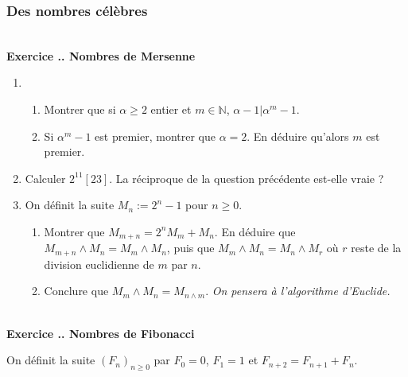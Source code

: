 \documentclass{article}
\newcommand{\mb}[1]{\mathbb{#1}}
\newcounter{exo}
\newcommand{\exercice}[1][\null]{\textbf{\\ Exercice \thesection.\theexo. #1} \addtocounter{exo}{1}}
\begin{document}
\subsubsection{Des nombres célèbres}


\exercice[Nombres de Mersenne]

\begin{enumerate}

\item 

\begin{enumerate}

\item Montrer que si $\alpha \ge 2$ entier et $m \in \mb{N}$, $\alpha-1 | \alpha^m -1 $.

\item Si $\alpha^m -1$ est premier, montrer que $\alpha = 2$. En déduire qu'alors $m$ est premier.

\end{enumerate}

\item Calculer $2^{11} [23]$. La réciproque de la question précédente est-elle vraie ?

\item On définit la suite $M_n := 2^n -1$ pour $n \ge 0$.

\begin{enumerate}


\item Montrer que $M_{m+n} = 2^n M_{m} + M_n$. En déduire que $M_{m+n} \wedge M_n = M_{m} \wedge M_n$, puis que $M_m \wedge M_n = M_n \wedge M_r $ où $r$ reste de la division euclidienne de $m$ par $n$.

\item Conclure que $M_m \wedge M_n = M_{n \wedge m}$. \emph{On pensera à l'algorithme d'Euclide.}
\end{enumerate}

\end{enumerate}


\exercice[Nombres de Fibonacci]

On définit la suite $(F_n)_{n \ge 0}$ par $F_0 = 0 $, $F_1 =1$ et $F_{n+2} = F_{n+1} + F_n$.
\end{document}
